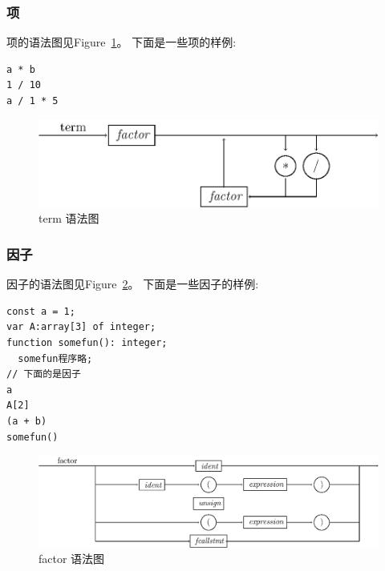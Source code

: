 \subsubsection{项}

项的语法图见Figure~\ref{term}。
下面是一些项的样例:
\begin{verbatim}
a * b
1 / 10
a / 1 * 5
\end{verbatim}
\begin{figure}[h!]
\begin{center}
    \includegraphics[scale=.8]{Figures/term.eps}
\end{center}
\caption{term 语法图}
\label{term}
\end{figure}
\subsubsection{因子}


因子的语法图见Figure~\ref{factor}。
下面是一些因子的样例:
\begin{verbatim}
const a = 1;
var A:array[3] of integer;
function somefun(): integer;
  somefun程序略;
// 下面的是因子
a 
A[2]
(a + b)
somefun()
\end{verbatim}
\begin{figure}[h!]
\begin{center}
    \includegraphics[scale=.8]{Figures/factor.eps}
\end{center}
\caption{factor 语法图}
\label{factor}
\end{figure}

